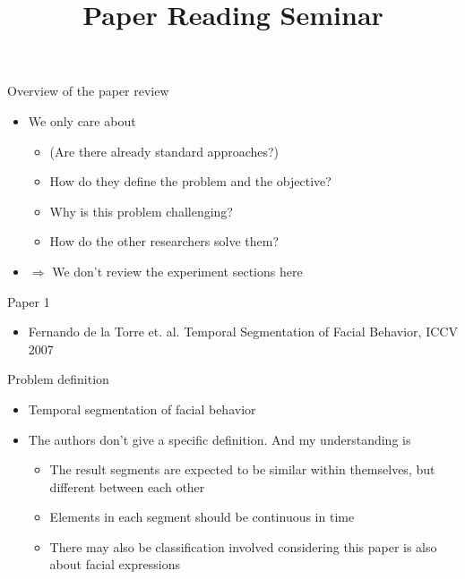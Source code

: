 \documentclass[12pt]{beamer}
\author{}
\title{Paper Reading Seminar}
\subtitle{}
\begin{document}
\begin{frame}[plain]
	\titlepage
\end{frame}

\begin{frame}{Overview of the paper review}
	\begin{itemize}
		\item We only care about
		\begin{itemize}
			\item (Are there already standard approaches?)
			\item How do they define the problem and the objective?
			\item Why is this problem challenging?
			\item How do the other researchers solve them?
		\end{itemize}
		\item $\Rightarrow$ We don't review the experiment sections here
	\end{itemize}
\end{frame}

\begin{frame}{Paper 1}
	\begin{itemize}
		\item Fernando de la Torre et. al. Temporal Segmentation of Facial Behavior, ICCV 2007 
	\end{itemize}
\end{frame}

\begin{frame}{Problem definition}
	\begin{itemize}
		\item Temporal segmentation of facial behavior
		\item The authors don't give a specific definition. And my understanding is
		\begin{itemize}
			\item The result segments are expected to be similar within themselves, but different between each other
			\item Elements in each segment should be continuous in time
			\item There may also be classification involved considering this paper is also about facial expressions
		\end{itemize}
	\end{itemize}
\end{frame}
\end{document}
